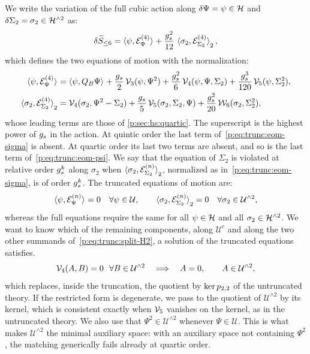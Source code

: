 We write the variation of the full cubic action along $\delta \Psi = \psi \in \Hs$ and $\delta \Sigma_2 = \sigma_2 \in \Hn{2}$ as:
\begin{equation}
\label{p:eq:trunc:variation}
\delta \caction[\le 6]
  = \pair{\psi}{\mathcal E^{(4)}_\Psi}
    + \frac{\gs^2}{12} \, \pair[2]{\sigma_2}{\mathcal E^{(4)}_{\Sigma_2}},
\end{equation}
which defines the two equations of motion with the normalization:
\begin{subequations}
\label{p:eq:trunc:eom}
\begin{align}
  \label{p:eq:trunc:eom-psi}
  \pair{\psi}{\mathcal E^{(4)}_\Psi}
    &
    = \pair{\psi}{Q_B \Psi}
      + \frac{\gs}{2} \, \vertex{3}(\psi, \Psi^2)
      + \frac{\gs^2}{6} \, \vertex{4}(\psi, \Psi, \Sigma_2)
      + \frac{\gs^3}{120} \, \vertex{5}(\psi, \Sigma_2^2),
  \\
  \label{p:eq:trunc:eom-sigma}
  \pair[2]{\sigma_2}{\mathcal E^{(4)}_{\Sigma_2}}
    &
    = \vertex{4}(\sigma_2, \Psi^2 - \Sigma_2)
      + \frac{\gs}{5} \, \vertex{5}(\sigma_2, \Sigma_2, \Psi)
      + \frac{\gs^2}{20} \, \dvertex{6}(\sigma_2, \Sigma_2^2),
\end{align}
\end{subequations}
whose leading terms are those of \cref{p:sec:hs:quartic}.
The superscript is the highest power of $\gs$ in the action.
At quintic order the last term of~\eqref{p:eq:trunc:eom-sigma} is absent.
At quartic order its last two terms are absent, and so is the last term of~\eqref{p:eq:trunc:eom-psi}.
We say that the equation of $\Sigma_2$ is violated at relative order $\gs^k$ along $\sigma_2$ when $\pair[2]{\sigma_2}{\mathcal E^{(n)}_{\Sigma_2}}$, normalized as in~\eqref{p:eq:trunc:eom-sigma}, is of order $\gs^k$.
The truncated equations of motion are:
\begin{equation}
\label{p:eq:trunc:eom-truncated}
\pair{\psi}{\mathcal E^{(n)}_\Psi}
  = 0
\quad
\forall \psi \in \mathcal U,
\qquad
\pair[2]{\sigma_2}{\mathcal E^{(n)}_{\Sigma_2}}
  = 0
\quad
\forall \sigma_2 \in \mathcal U^{\wedge 2},
\end{equation}
whereas the full equations require the same for all $\psi \in \Hs$ and all $\sigma_2 \in \Hn{2}$.
We want to know which of the remaining components, along $\mathcal U^c$ and along the two other summands of~\eqref{p:eq:trunc:split-H2}, a solution of the truncated equations satisfies.
\begin{equation}
  \label{p:eq:trunc:nondegenerate}
  \vertex{4}(A, B)
    = 0
  \ \ \forall B \in \mathcal U^{\wedge 2}
  \quad \Longrightarrow \quad
  A
    = 0,
  \qquad
  A \in \mathcal U^{\wedge 2},
\end{equation}
which replaces, inside the truncation, the quotient by $\ker \sprod{2}{2}$ of the untruncated theory.
If the restricted form is degenerate, we pass to the quotient of $\mathcal U^{\wedge 2}$ by its kernel, which is consistent exactly when $\vertex{5}$ vanishes on the kernel, as in the untruncated theory.
We also use that $\Psi^2 \in \mathcal U^{\wedge 2}$ whenever $\Psi \in \mathcal U$.
This is what makes $\mathcal U^{\wedge 2}$ the minimal auxiliary space: with an auxiliary space not containing $\Psi^2$, the matching generically fails already at quartic order.

